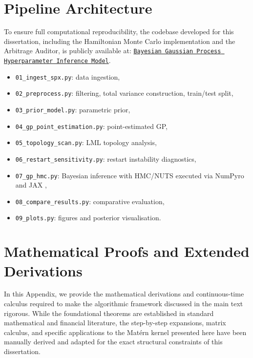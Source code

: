\documentclass[12pt,oneside]{report}
\theoremstyle{definition}
\theoremstyle{remark}
\begin{document}
\chapter{Pipeline Architecture}
To ensure full computational reproducibility, the codebase developed for this dissertation, including the Hamiltonian Monte Carlo implementation and the Arbitrage Auditor, is publicly available at: \href{https://github.com/mishavelial/Bayesian Gaussian Process Hyperparameter Inference Model}{\texttt{Bayesian Gaussian Process Hyperparameter Inference Model}}.
\begin{itemize}[leftmargin=2em]
    \item \texttt{01\_ingest\_spx.py}: data ingestion,
    \item \texttt{02\_preprocess.py}: filtering, total variance construction, train/test split,
    \item \texttt{03\_prior\_model.py}: parametric prior,
    \item \texttt{04\_gp\_point\_estimation.py}: point-estimated GP,
    \item \texttt{05\_topology\_scan.py}: LML topology analysis,
    \item \texttt{06\_restart\_sensitivity.py}: restart instability diagnostics,
    \item \texttt{07\_gp\_hmc.py}: Bayesian inference with HMC/NUTS \cite{neal2011mcmc, hoffman2014nuts} executed via NumPyro \cite{phan2019numpyro} and JAX \cite{jax2018github},
    \item \texttt{08\_compare\_results.py}: comparative evaluation,
    \item \texttt{09\_plots.py}: figures and posterior visualisation.
\end{itemize}


\chapter{Mathematical Proofs and Extended Derivations}
In this Appendix, we provide the mathematical derivations and continuous-time calculus required to make the algorithmic framework discussed in the main text rigorous. While the foundational theorems are established in standard mathematical and financial literature, the step-by-step expansions, matrix calculus, and specific applications to the Matérn kernel presented here have been manually derived and adapted for the exact structural constraints of this dissertation. 
\end{document}
